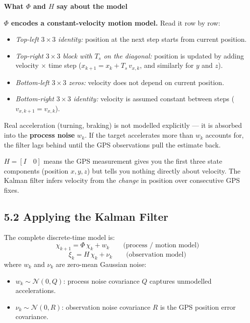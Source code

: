 \documentclass[12pt, a4paper]{article}
\begin{document}
\begin{notebox}
  \textbf{What $\Phi$ and $H$ say about the model}

  \textbf{$\Phi$ encodes a constant-velocity motion model.}
  Read it row by row:
  \begin{itemize}[leftmargin=1.5em, itemsep=2pt]
    \item \emph{Top-left $3\times3$ identity:} position at the next step
      starts from current position.
    \item \emph{Top-right $3\times3$ block with $T_s$ on the diagonal:}
      position is updated by adding velocity $\times$ time step
      ($x_{k+1} = x_k + T_s\,v_{x,k}$, and similarly for $y$ and $z$).
    \item \emph{Bottom-left $3\times3$ zeros:} velocity does not depend
      on current position.
    \item \emph{Bottom-right $3\times3$ identity:} velocity is assumed
      constant between steps ($v_{x,k+1} = v_{x,k}$).
  \end{itemize}
  Real acceleration (turning, braking) is not modelled explicitly ---
  it is absorbed into the \textbf{process noise} $w_k$.
  If the target accelerates more than $w_k$ accounts for, the filter
  lags behind until the GPS observations pull the estimate back.

  \textbf{$H = [I \quad 0]$} means the GPS measurement gives you the
  first three state components (position $x, y, z$) but tells you
  nothing directly about velocity.
  The Kalman filter infers velocity from the \emph{change} in position
  over consecutive GPS fixes.
\end{notebox}

\subsection*{5.2 \quad Applying the Kalman Filter}

The complete discrete-time model is:
\[
  \chi_{k+1} = \Phi\,\chi_k + w_k \qquad \text{(process / motion model)}
\]
\[
  \xi_k = H\,\chi_k + \nu_k \qquad \text{(observation model)}
\]
where $w_k$ and $\nu_k$ are zero-mean Gaussian noise:
\begin{itemize}[leftmargin=1.5em, itemsep=2pt]
  \item $w_k \sim \mathcal{N}(0, Q)$: process noise covariance $Q$
    captures unmodelled accelerations.
  \item $\nu_k \sim \mathcal{N}(0, R)$: observation noise covariance $R$
    is the GPS position error covariance.
\end{itemize}
\end{document}
